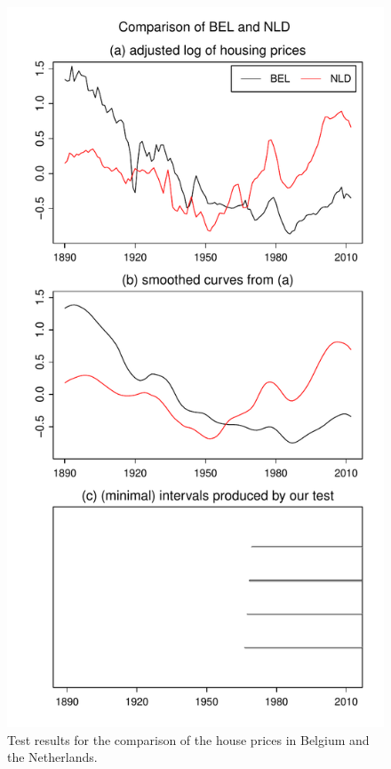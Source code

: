 \documentclass[12pt]{article}
\begin{document}
\begin{figure}
\hspace{0.1cm}
\begin{minipage}[t]{0.24\textwidth}
\includegraphics[width=\textwidth]{output/plots/hp/BEL_vs_NLD}
\caption{Test results for the comparison of the house prices in Belgium and the Netherlands.}\label{fig:hp:Belgium:Netherlands}
\end{minipage}

\end{figure}
\end{document}
